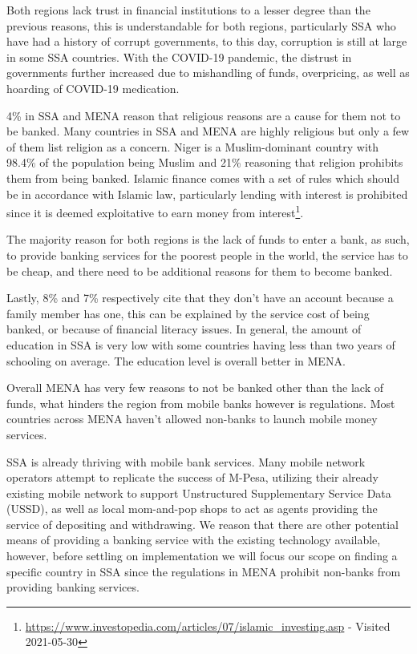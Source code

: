 \documentclass[11pt, a4paper]{article}
\begin{document}
Both regions lack trust in financial institutions to a lesser degree than the previous reasons, this is understandable for both regions, particularly SSA who have had a history of corrupt governments, to this day, corruption is still at large in some SSA countries. With the COVID-19 pandemic, the distrust in governments further increased due to mishandling of funds, overpricing, as well as hoarding of COVID-19 medication\cite{cpi2020}.

4\% in SSA and MENA reason that religious reasons are a cause for them not to be banked. Many countries in SSA and MENA are highly religious but only a few of them list religion as a concern. Niger is a Muslim-dominant country with 98.4\% of the population being Muslim\cite{muslim} and 21\% reasoning that religion prohibits them from being banked\cite{gfindex}. Islamic finance comes with a set of rules which should be in accordance with Islamic law, particularly lending with interest is prohibited since it is deemed exploitative to earn money from interest\footnote{\url{https://www.investopedia.com/articles/07/islamic\_investing.asp} - Visited 2021-05-30}.

The majority reason for both regions is the lack of funds to enter a bank, as such, to provide banking services for the poorest people in the world, the service has to be cheap, and there need to be additional reasons for them to become banked.

Lastly, 8\% and 7\% respectively cite that they don't have an account because a family member has one, this can be explained by the service cost of being banked, or because of financial literacy issues. In general, the amount of education in SSA is very low with some countries having less than two years of schooling on average\cite{hdr}. The education level is overall better in MENA\cite{hdr}.

Overall MENA has very few reasons to not be banked other than the lack of funds, what hinders the region from mobile banks however is regulations. Most countries across MENA haven't allowed non-banks to launch mobile money services.\cite{gsmareg}

SSA is already thriving with mobile bank services. Many mobile network operators attempt to replicate the success of M-Pesa, utilizing their already existing mobile network to support Unstructured Supplementary Service Data (USSD), as well as local mom-and-pop shops to act as agents providing the service of depositing and withdrawing. We reason that there are other potential means of providing a banking service with the existing technology available, however, before settling on implementation we will focus our scope on finding a specific country in SSA since the regulations in MENA prohibit non-banks from providing banking services.
\end{document}
